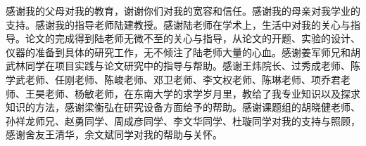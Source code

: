 感谢我的父母对我的教育，谢谢你们对我的宽容和信任。感谢我的母亲对我学业的支持。感谢我的指导老师陆建教授。感谢陆老师在学术上，生活中对我的关心与指导。论文的完成得到陆老师无微不至的关心与指导，从论文的开题、实验的设计、仪器的准备到具体的研究工作，无不倾注了陆老师大量的心血。感谢姜军师兄和胡武林同学在项目实践与论文研究中的指导与帮助。感谢王炜院长、过秀成老师、陈学武老师、任刚老师、陈峻老师、邓卫老师、李文权老师、陈琳老师、项乔君老师、王昊老师、杨敏老师，在东南大学的求学岁月里，教给了我专业知识以及探求知识的方法，感谢梁衡弘在研究设备方面给予的帮助。感谢课题组的胡晓健老师、孙祥龙师兄、赵勇同学、周成彦同学、李文华同学、杜璇同学对我的支持与照顾，感谢舍友王清华，余文斌同学对我的帮助与关怀。


